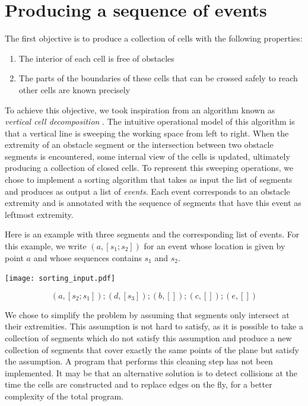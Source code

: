 \documentclass{easychair}
\begin{document}
\section{Producing a sequence of events}
The first objective is to produce a collection of cells with the following
properties:
\begin{enumerate}
\item The interior of each cell is free of obstacles
\item The parts of the boundaries of these cells that can be crossed
  safely to reach other cells are known precisely
\end{enumerate}
To achieve this objective, we took inspiration from an algorithm known as
{\em vertical cell decomposition} \cite{Latombe91}.  The intuitive
operational model of this algorithm is that a vertical line is
sweeping the working space from left to right.  When the extremity of
an obstacle segment or the intersection between two obstacle segments
is encountered, some internal view of the cells is updated, ultimately
producing a collection of closed cells.  To represent this sweeping
operations, we chose to implement a sorting algorithm that takes as
input the list of segments and produces as output a list of {\em
  events}.  Each event corresponds to an obstacle extremity and is
annotated with the sequence of segments that have this event as
leftmost extremity.

Here is an example with three segments and the corresponding list of events.
For this example, we write \((a, [s_1;s_2])\) for an event whose location is
given by point \(a\) and whose sequences contains \(s_1\) and \(s_2\).

\begin{center}
\texttt{[image: sorting\_input.pdf]}
\end{center}
\[ (a, [s_2; s_1]); (d, [s_3]); (b, []); (c, []); (e,[])\]

We chose to simplify the problem by assuming that segments only
intersect at their extremities.  This assumption is not hard to
satisfy, as it is possible to take a collection of segments which do
not satisfy this assumption and produce a new collection of segments
that cover exactly the same points of the plane but satisfy the
assumption.  A program that performs this cleaning step has not been
implemented.  It may be that an alternative solution is to detect
collisions at the time the cells are constructed and to replace edges
on the fly, for a better complexity of the total program.
\end{document}
